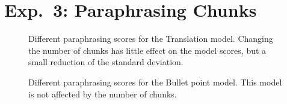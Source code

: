 \section{Exp.\ 3: Paraphrasing Chunks}
\label{sec:app_chunks}

\begin{figure}[H]
    \centering
    
    \caption[Paraphrasing scores for the Translation model.]{Different paraphrasing scores for the Translation model. 
    Changing the number of chunks has little effect on the model scores, but a small reduction of the standard deviation.}
    \label{fig:abl_chunks_gutenberg_translation}
\end{figure}

\begin{figure}[H]
    \centering
    
    \caption[Paraphrasing scores for the Bullet point model.]{Different paraphrasing scores for the Bullet point model. 
    This model is not affected by the number of chunks.}
    \label{fig:abl_chunks_student_essays_task}
\end{figure}